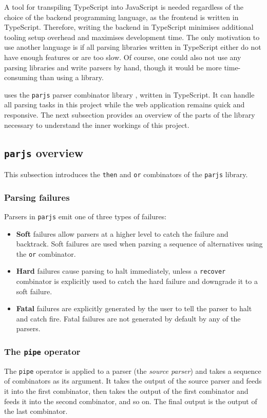 A tool for transpiling TypeScript into JavaScript is needed regardless of the choice of the backend programming language, as the frontend is written in TypeScript. Therefore, writing the backend in TypeScript minimises additional tooling setup overhead and maximises development time. The only motivation to use another language is if all parsing libraries written in TypeScript either do not have enough features or are too slow. Of course, one could also not use any parsing libraries and write parsers by hand, though it would be more time-consuming than using a library.

\projectname{} uses the \lstinline{parjs} parser combinator library \cite{parjs}, written in TypeScript. It can handle all parsing tasks in this project while the web application remains quick and responsive. The next subsection provides an overview of the parts of the library necessary to understand the inner workings of this project.

\subsection{\texorpdfstring{\lstinline{parjs}}{parjs} overview}
This subsection introduces the \lstinline{then} and \lstinline{or} combinators of the \lstinline{parjs} library.

\subsubsection{Parsing failures}
Parsers in \lstinline{parjs} emit one of three types of failures:
\begin{itemize}
    \item \textbf{Soft} failures allow parsers at a higher level to catch the failure and backtrack. Soft failures are used when parsing a sequence of alternatives using the \lstinline{or} combinator.
    \item \textbf{Hard} failures cause parsing to halt immediately, unless a \lstinline{recover} combinator is explicitly used to catch the hard failure and downgrade it to a soft failure.
    \item \textbf{Fatal} failures are explicitly generated by the user to tell the parser to halt and catch fire. Fatal failures are not generated by default by any of the parsers.
\end{itemize}

\subsubsection{The \lstinline{pipe} operator}
The \lstinline{pipe} operator \cite{parjs:pipe} is applied to a parser (the \textit{source parser}) and takes a sequence of combinators as its argument. It takes the output of the source parser and feeds it into the first combinator, then takes the output of the first combinator and feeds it into the second combinator, and so on. The final output is the output of the last combinator.

